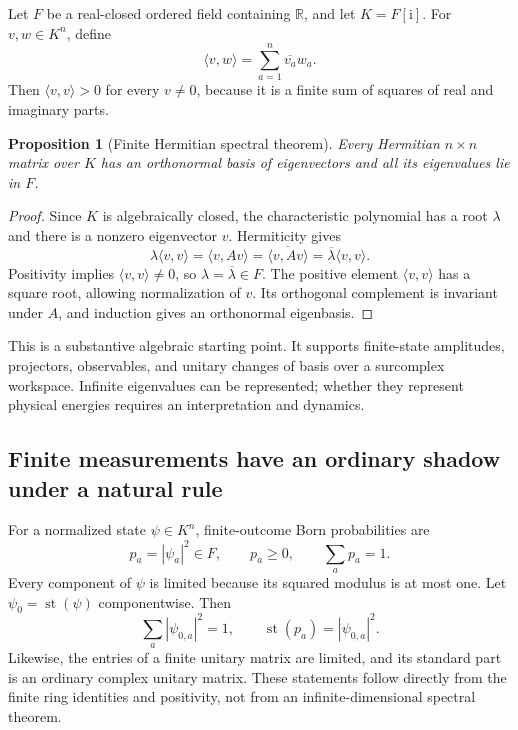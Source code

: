 \documentclass[11pt,letterpaper]{article}
\newcommand{\R}{\mathbb{R}}
\newcommand{\st}{\operatorname{st}}
\newcommand{\ii}{\mathrm{i}}
\newtheorem{proposition}{Proposition}[section]
\theoremstyle{definition}
\theoremstyle{remark}
\begin{document}
Let $F$ be a real-closed ordered field containing $\R$, and let $K=F[\ii]$.
For $v,w\in K^n$, define
\[
 \langle v,w\rangle=\sum_{a=1}^n\overline{v_a}w_a.
\]
Then $\langle v,v\rangle>0$ for every $v\ne0$, because it is a finite sum of
squares of real and imaginary parts.

\begin{proposition}[Finite Hermitian spectral theorem]
\label{prop:spectral}
Every Hermitian $n\times n$ matrix over $K$ has an orthonormal basis of
eigenvectors and all its eigenvalues lie in $F$.
\end{proposition}
\begin{proof}
Since $K$ is algebraically closed, the characteristic polynomial has a root
$\lambda$ and there is a nonzero eigenvector $v$. Hermiticity gives
\[
 \lambda\langle v,v\rangle
 =\langle v,Av\rangle
 =\overline{\langle v,Av\rangle}
 =\overline\lambda\langle v,v\rangle.
\]
Positivity implies $\langle v,v\rangle\ne0$, so
$\lambda=\overline\lambda\in F$. The positive element
$\langle v,v\rangle$ has a square root, allowing normalization of $v$.
Its orthogonal complement is invariant under $A$, and induction gives an
orthonormal eigenbasis.
\end{proof}

This is a substantive algebraic starting point. It supports finite-state
amplitudes, projectors, observables, and unitary changes of basis over a
surcomplex workspace. Infinite eigenvalues can be represented; whether they
represent physical energies requires an interpretation and dynamics.

\subsection{Finite measurements have an ordinary shadow under a natural rule}

For a normalized state $\psi\in K^n$, finite-outcome Born probabilities are
\[
 p_a=|\psi_a|^2\in F,\qquad p_a\geq0,\qquad\sum_a p_a=1.
\]
Every component of $\psi$ is limited because its squared modulus is at most
one. Let $\psi_0=\st(\psi)$ componentwise. Then
\begin{equation}
 \sum_a|\psi_{0,a}|^2=1,
 \qquad \st(p_a)=|\psi_{0,a}|^2.
 \label{eq:bornshadow}
\end{equation}
Likewise, the entries of a finite unitary matrix are limited, and its standard
part is an ordinary complex unitary matrix. These statements follow directly
from the finite ring identities and positivity, not from an infinite-dimensional
spectral theorem.
\end{document}
